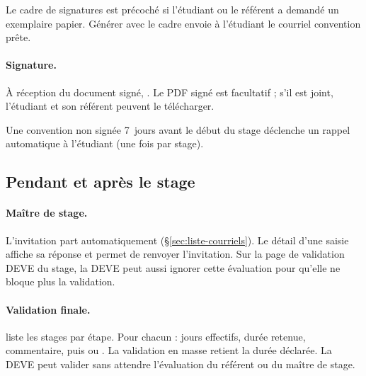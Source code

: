 \documentclass[11pt,a4paper]{article}
\begin{document}

Le cadre de signatures est précoché si l'étudiant ou le référent a demandé un
exemplaire papier. Générer avec le cadre envoie à l'étudiant le courriel
\og convention prête\fg{}.

\paragraph{Signature.} À réception du document signé, .
Le PDF signé est facultatif ; s'il est joint, l'étudiant et son référent peuvent
le télécharger.


Une convention non signée 7~jours avant le début du stage déclenche un rappel
automatique à l'étudiant (une fois par stage).

\subsection{Pendant et après le stage}

\paragraph{Maître de stage.} L'invitation part automatiquement
(§\ref{sec:liste-courriels}). Le détail d'une saisie affiche sa réponse et
permet de renvoyer l'invitation. Sur la page de validation DEVE du stage, la DEVE
peut aussi ignorer cette évaluation pour qu'elle ne bloque plus la validation.


\paragraph{Validation finale.}  liste les stages par
étape. Pour chacun : jours effectifs, durée retenue, commentaire, puis
 ou . La validation en masse retient
la durée déclarée. La DEVE peut valider sans attendre l'évaluation du référent
ou du maître de stage.
\end{document}
